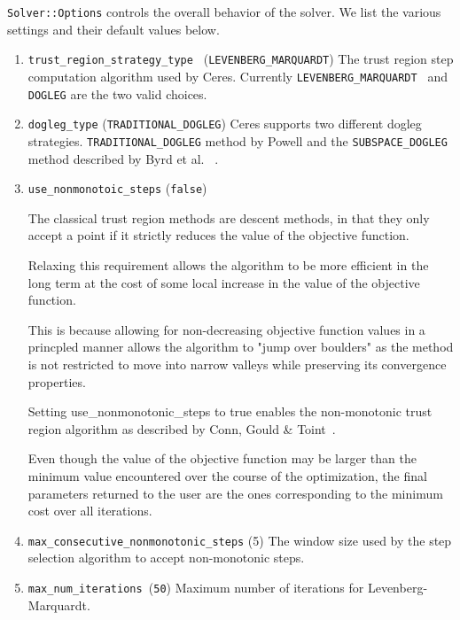 \texttt{Solver::Options} controls the overall behavior of the solver. We list the various settings and their default values below.

\begin{enumerate}

\item{\texttt{trust\_region\_strategy\_type }} (\texttt{LEVENBERG\_MARQUARDT}) The  trust region step computation algorithm used by Ceres. Currently \texttt{LEVENBERG\_MARQUARDT } and \texttt{DOGLEG} are the two valid choices.

\item{\texttt{dogleg\_type}} (\texttt{TRADITIONAL\_DOGLEG})  Ceres supports two different dogleg strategies.
\texttt{TRADITIONAL\_DOGLEG} method by Powell and the
\texttt{SUBSPACE\_DOGLEG} method described by Byrd et al.
~\cite{byrd1988approximate}.

\item{\texttt{use\_nonmonotoic\_steps}} (\texttt{false})

The classical trust region methods are descent methods, in that
      they only accept a point if it strictly reduces the value of
      the objective function.

      Relaxing this requirement allows the algorithm to be more
      efficient in the long term at the cost of some local increase
      in the value of the objective function.

      This is because allowing for non-decreasing objective function
      values in a princpled manner allows the algorithm to "jump over
      boulders" as the method is not restricted to move into narrow
      valleys while preserving its convergence properties.

      Setting use_nonmonotonic_steps to true enables the
      non-monotonic trust region algorithm as described by Conn,
      Gould & Toint~\cite{conn2000trust}.

 Even though the value of the objective function may be larger
     than the minimum value encountered over the course of the
     optimization, the final parameters returned to the user are the
     ones corresponding to the minimum cost over all iterations.

\item{\texttt{max\_consecutive\_nonmonotonic\_steps}} (5)
 The
     window size used by the step selection algorithm to accept
    non-monotonic steps.

\item{\texttt{max\_num\_iterations }}(\texttt{50}) Maximum number of iterations for Levenberg-Marquardt.


\end{enumerate}
